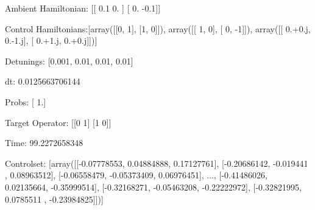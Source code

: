 \documentclass{article}
\begin{document}
    

\newpage

Ambient Hamiltonian: [[ 0.1  0. ]
 [ 0.  -0.1]]

Control Hamiltonians:[array([[0, 1],
       [1, 0]]), array([[ 1,  0],
       [ 0, -1]]), array([[ 0.+0.j,  0.-1.j],
       [ 0.+1.j,  0.+0.j]])]

Detunings: [0.001, 0.01, 0.01, 0.01]

 dt: 0.0125663706144

Probs: [ 1.]

Target Operator: [[0 1]
 [1 0]]

Time: 99.2272658348

Controlset: [array([[-0.07778553,  0.04884888,  0.17127761],
       [-0.20686142, -0.019441  ,  0.08963512],
       [-0.06558479, -0.05373409,  0.06976451],
       ..., 
       [-0.41486026,  0.02135664, -0.35999514],
       [-0.32168271, -0.05463208, -0.22222972],
       [-0.32821995,  0.0785511 , -0.23984825]])]
\end{document}
